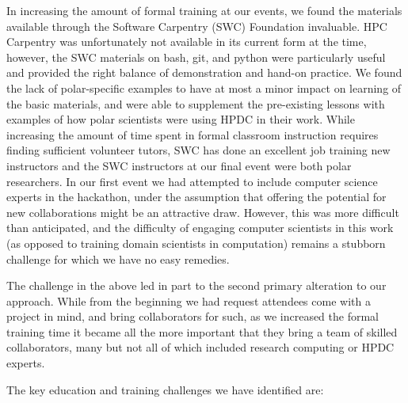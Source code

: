 \documentclass[10pt,letterpaper,draft]{article}
\begin{document}
In increasing the amount of formal training at our events, we found the materials available through the Software Carpentry (SWC) Foundation invaluable. HPC Carpentry was unfortunately not available in its current form at the time, however, the SWC materials on bash, git, and python were particularly useful and provided the right balance of demonstration and hand-on practice. We found the lack of polar-specific examples to have at most a minor impact on learning of the basic materials, and were able to supplement the pre-existing lessons with examples of how polar scientists were using HPDC in their work. While increasing the amount of time spent in formal classroom instruction requires finding sufficient volunteer tutors, SWC has done an excellent job training new instructors and the SWC instructors at our final event were both polar researchers.  In our first event we had attempted to include computer science experts in the hackathon, under the assumption that offering the potential for new collaborations might be an attractive draw. However, this was more difficult than anticipated, and the difficulty of engaging computer scientists in this work (as opposed to training domain scientists in computation) remains a stubborn challenge for which we have no easy remedies.

The challenge in the above led in part to the second primary alteration to our approach.  While from the beginning we had request attendees come with a project in mind, and bring collaborators for such, as we increased the formal training time it became all the more important that they bring a team of skilled collaborators, many but not all of which included research computing or HPDC experts.

The key education and training challenges we have identified are:
\end{document}
